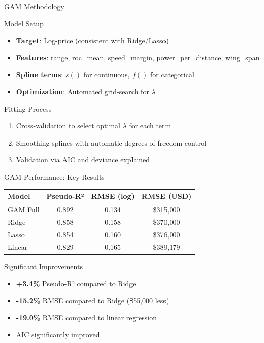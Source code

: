 \documentclass{beamer}
\begin{document}
\begin{frame}{GAM Methodology}
    \begin{block}{Model Setup}
        \begin{itemize}
            \item \textbf{Target}: Log-price (consistent with Ridge/Lasso)
            \item \textbf{Features}: range, roc\_mean, speed\_margin, power\_per\_distance, wing\_span
            \item \textbf{Spline terms}: $s()$ for continuous, $f()$ for categorical
            \item \textbf{Optimization}: Automated grid-search for $\lambda$
        \end{itemize}
    \end{block}
    
    \begin{block}{Fitting Process}
        \begin{enumerate}
            \item Cross-validation to select optimal $\lambda$ for each term
            \item Smoothing splines with automatic degrees-of-freedom control
            \item Validation via AIC and deviance explained
        \end{enumerate}
    \end{block}
\end{frame}

\begin{frame}{GAM Performance: Key Results}
    \begin{center}
        \begin{tabular}{@{}lccc@{}}
            \toprule
            \textbf{Model} & \textbf{Pseudo-R²} & \textbf{RMSE (log)} & \textbf{RMSE (USD)} \\
            \midrule
            GAM Full         & 0.892 & 0.134 & \$315{,}000 \\
            Ridge            & 0.858 & 0.158 & \$370{,}000 \\
            Lasso            & 0.854 & 0.160 & \$376{,}000 \\
            Linear           & 0.829 & 0.165 & \$389{,}179 \\
            \bottomrule
        \end{tabular}
    \end{center}
    \vspace{0.5cm}
    \begin{block}{Significant Improvements}
        \begin{itemize}
            \item \textbf{+3.4\%} Pseudo-R² compared to Ridge
            \item \textbf{-15.2\%} RMSE compared to Ridge (\$55,000 less)
            \item \textbf{-19.0\%} RMSE compared to linear regression
            \item AIC significantly improved
        \end{itemize}
    \end{block}
\end{frame}
\end{document}
